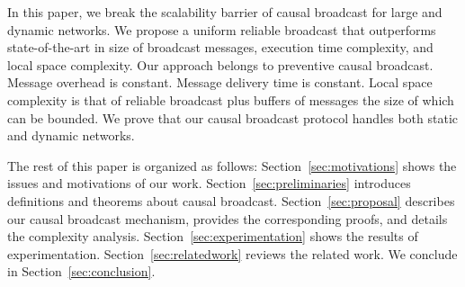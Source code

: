 In this paper, we break the scalability barrier of causal broadcast for large
and dynamic networks. We propose a uniform reliable broadcast that outperforms
state-of-the-art in size of broadcast messages, execution time complexity, and
local space complexity. Our approach belongs to preventive causal
broadcast. Message overhead is constant. Message delivery time is
constant. Local space complexity is that of reliable broadcast plus buffers of
messages the size of which can be bounded.
We prove that our causal broadcast protocol handles both static and dynamic
networks. 


The rest of this paper is organized as follows: Section~\ref{sec:motivations}
shows the issues and motivations of our work. Section~\ref{sec:preliminaries}
introduces definitions and theorems about causal
broadcast. Section~\ref{sec:proposal} describes our causal broadcast mechanism,
provides the corresponding proofs, and details the complexity
analysis. Section~\ref{sec:experimentation} shows the results of
experimentation.  Section~\ref{sec:relatedwork} reviews the related work. We
conclude in Section~\ref{sec:conclusion}.




